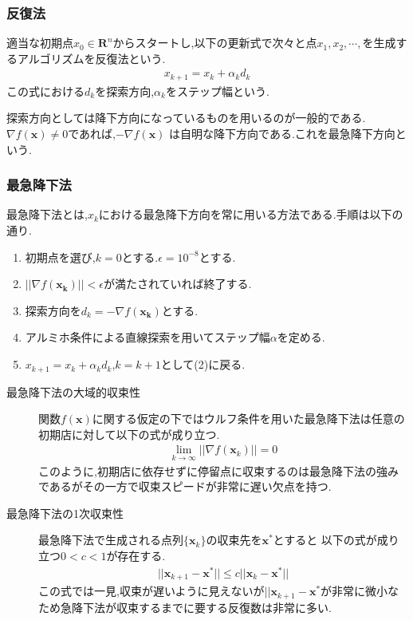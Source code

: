 \documentclass[12pt]{jarticle}
\begin{document}
\subsubsection{反復法}
適当な初期点$x_0\in \boldsymbol{R}^n$からスタートし,以下の更新式で次々と点$x_1,x_2,\cdots,$を生成するアルゴリズムを反復法という.
\begin{eqnarray}
    x_{k+1}=x_k+\alpha_kd_k\nonumber
\end{eqnarray}
この式における$d_k$を探索方向,$\alpha_k$をステップ幅という.\\
\par 探索方向としては降下方向になっているものを用いるのが一般的である.$\nabla f(\boldsymbol{x})\neq 0$であれば,$-\nabla f(\boldsymbol{x})$
は自明な降下方向である.これを最急降下方向という.
\subsubsection{最急降下法}
最急降下法とは,$x_k$における最急降下方向を常に用いる方法である.手順は以下の通り.
\begin{enumerate}
    \item 初期点を選び,$k=0$とする.$\epsilon=10^{-8}$とする.
    \item $||\nabla f(\boldsymbol{x_k})||<\epsilon$が満たされていれば終了する.
    \item 探索方向を$d_k=-\nabla f(\boldsymbol{x_k})$とする.
    \item アルミホ条件による直線探索を用いてステップ幅$\alpha$を定める.
    \item $x_{k+1}=x_k+\alpha_kd_k$,$k=k+1$として(2)に戻る.
\end{enumerate}
\begin{description}
    \item[最急降下法の大域的収束性] 関数$f(\boldsymbol{x})$に関する仮定の下ではウルフ条件を用いた最急降下法は任意の初期店に対して以下の式が成り立つ.
          \begin{eqnarray}
              \lim_{k\rightarrow \infty}||\nabla f(\boldsymbol{x}_k)||=0\nonumber
          \end{eqnarray}
          このように,初期店に依存せずに停留点に収束するのは最急降下法の強みであるがその一方で収束スピードが非常に遅い欠点を持つ. 
    \item[最急降下法の1次収束性] 最急降下法で生成される点列$\{\boldsymbol{x}_k\}$の収束先を$\boldsymbol{x}^*$とすると
          以下の式が成り立つ$0<c<1$が存在する.
          \begin{eqnarray}
              ||\boldsymbol{x}_{k+1}-\boldsymbol{x}^*||\leq c||\boldsymbol{x}_{k}-\boldsymbol{x}^*||\nonumber
          \end{eqnarray}
          この式では一見,収束が遅いように見えないが$||\boldsymbol{x}_{k+1}-\boldsymbol{x}^*$が非常に微小なため急降下法が収束するまでに要する反復数は非常に多い.
\end{description}
\end{document}
